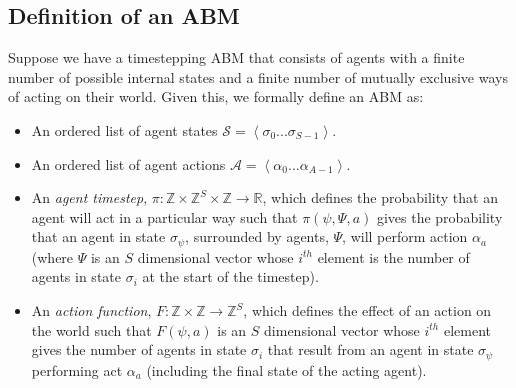 \documentclass{article}
\begin{document}
\subsection{Definition of an ABM}
\label{abmdef}
Suppose we have a timestepping ABM that consists of agents with a finite number of possible internal states and a finite number of mutually exclusive ways of acting on their world. Given this, we formally define an ABM as:
\begin{itemize}
	\item An ordered list of agent states $\mathcal{S} = \left<\sigma_0 ... \sigma_{S-1}\right>$.

	\item An ordered list of agent actions $\mathcal{A} =\left< \alpha_0 ... \alpha_{A-1} \right>$.
	
	\item An \textit{agent timestep}, $\pi : \mathbb{Z}\times\mathbb{Z}^S\times\mathbb{Z} \to \mathbb{R}$, which defines the probability that an agent will act in a particular way such that $\pi(\psi,\Psi,a)$ gives the probability that an agent in state $\sigma_\psi$, surrounded by agents, $\Psi$, will perform action $\alpha_a$ (where $\Psi$ is an $S$ dimensional vector whose $i^{th}$ element is the number of agents in state $\sigma_i$ at the start of the timestep).
	
	\item An \textit{action function}, $F: \mathbb{Z} \times \mathbb{Z} \to \mathbb{Z}^S$, which defines the effect of an action on the world such that $F(\psi, a)$ is an $S$ dimensional vector whose $i^{th}$ element gives the number of agents in state $\sigma_i$ that result from an agent in state $\sigma_\psi$ performing act $\alpha_a$ (including the final state of the acting agent).
\end{itemize}
\end{document}
